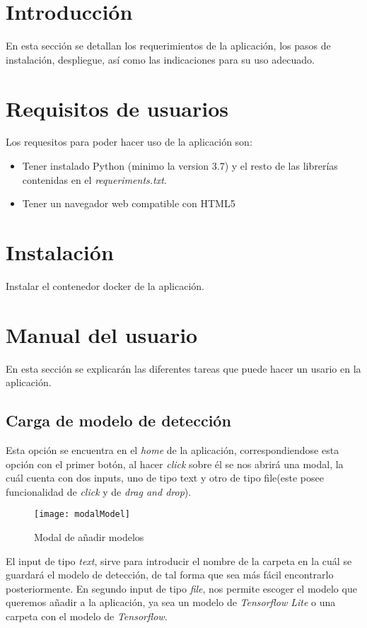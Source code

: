 
\section{Introducción}
En esta sección se detallan los requerimientos de la aplicación, los pasos de instalación, despliegue, así como las indicaciones para su uso adecuado.
\section{Requisitos de usuarios}
Los requesitos para poder hacer uso de la aplicación son:
\begin{itemize}
    \item Tener instalado Python (minimo la version 3.7) y el resto de las librerías contenidas en el \textit{requeriments.txt}.
    \item Tener un navegador web compatible con HTML5 
\end{itemize}

\section{Instalación}
Instalar el contenedor docker de la aplicación.

\section{Manual del usuario}
En esta sección se explicarán las diferentes tareas que puede hacer un usario en la aplicación.
\subsection{Carga de modelo de detección}
Esta opción se encuentra en el \textit{home} de la aplicación, correspondiendose esta opción con el primer botón, al hacer \textit{click} sobre él se nos abrirá una modal, la cuál cuenta con dos inputs, uno de tipo text y otro de tipo file(este posee funcionalidad de \textit{click} y de \textit{drag and drop}).
\begin{figure}[!h]
    \centering
    \texttt{[image: modalModel]}
    \caption{Modal de añadir modelos}\label{fig:modalModel}
\end{figure}
El input de tipo \textit{text}, sirve para introducir el nombre de la carpeta en la cuál se guardará el modelo de detección, de tal forma que sea más fácil encontrarlo posteriormente.
En segundo input de tipo \textit{file}, nos permite escoger el modelo que queremos añadir a la aplicación, ya sea un modelo de \textit{Tensorflow Lite} o una carpeta con el modelo de \textit{Tensorflow}.
